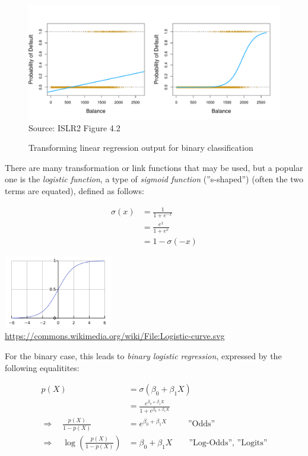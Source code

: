 \begin{figure}
\centering
\includegraphics[width=\textwidth]{../class11/Figures_Chapters_1-6/Chapter4/4_2.pdf}
\scriptsize Source: ISLR2 Figure 4.2

\caption{Transforming linear regression output for binary classification}
\label{fig:classification1}
\end{figure}

There are many transformation or link functions that may be used, but a popular one is the \emph{logistic function}, a type of \emph{sigmoid function} (''s-shaped'') (often the two terms are equated), defined as follows:

\begin{minipage}{.4\textwidth}
\begin{align*}
  \sigma(x) &= \frac{1}{1 + e^{-x}} \\
  &= \frac{e^x}{1 + e^x} \\
  &= 1 - \sigma(-x)
\end{align*}
\end{minipage}
\begin{minipage}{.6\textwidth}
\centering
\includegraphics[height=1.25in]{logistic.png} \\

\tiny \url{https://commons.wikimedia.org/wiki/File:Logistic-curve.svg} \normalsize
\end{minipage}

For the binary case, this leads to \emph{binary logistic regression}, expressed by the following equalitites:

\begin{align}
p(X) &= \sigma( \beta_0 + \beta_1 X) \nonumber \\ 
     &= \frac{e^{\beta_0 + \beta_1 X}}{1 + e^{\beta_0 + \beta_1 X}} \label{eq:logistic} \\
\Rightarrow \quad \frac{p(X)}{1 - p(X)} &= e^{\beta_0 + \beta_1 X} \qquad\;\; \text{''Odds''} \label{eq:odds} \\
\Rightarrow \quad \log \left( \frac{p(X)}{1 - p(X)} \right) &= \beta_0 + \beta_1 X \qquad \text{''Log-Odds'', ''Logits''} \label{eq:logits}
\end{align}

